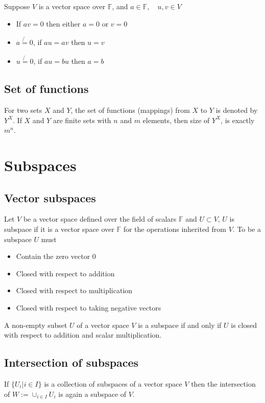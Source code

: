 \documentclass[12pt]{article}
\begin{document}
	\begin{thm}
		Suppose $V$ is a vector space over $\mathbb{F}$, and $a \in \mathbb{F}, \quad u,v \in V$
		\begin{itemize}
			\item If $av = 0$ then either $a = 0$ or $v = 0$
			\item $a \not{=} 0$, if $au = av$ then $u=v$
			\item $u \not{=} 0$, if $au = bu$ then $a=b$
		\end{itemize}
	\end{thm}
	
	\subsection{Set of functions}
	For two sets $X$ and $Y$, the set of functions (mappings) from $X$ to $Y$ is denoted by $Y^X$. If $X$ and $Y$ are finite sets with
	$n$ and $m$ elements, then size of $Y^X$, is exactly $m^n$.
	
\section{Subspaces}

	\subsection{Vector subspaces}
	\begin{defn}
		Let $V$ be a vector space defined over the field of scalars $\mathbb{F}$ and $U \subset V$, $U$ 
		is subspace if it is a vector space over $\mathbb{F}$ for the operations inherited from $V$. 
		To be a subspace $U$ must
		\begin{itemize}
			\item Contain the zero vector $0$
			\item Closed with respect to addition
			\item Closed with respect to multiplication
			\item Closed with respect to taking negative vectors
		\end{itemize}
	\end{defn}
	
	\begin{thm}
		A non-empty subset $U$ of a vector space $V$ is a subspace if and only if $U$ is closed with respect to addition and scalar multiplication.
	\end{thm}
	
	\subsection{Intersection of subspaces}
	\begin{thm}
		If $\{ U_i | i \in I\}$ is a collection of subspaces of a vector space $V$ then the intersection of $W := \cup_{i \in I} U_i$ is again a subspace of $V$.
	\end{thm}
	
\end{document}
